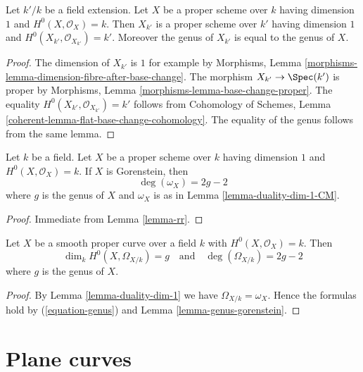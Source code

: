 \begin{lemma}
\label{lemma-genus-base-change}
Let $k'/k$ be a field extension. Let $X$ be a proper scheme over $k$ having
dimension $1$ and $H^0(X, \mathcal{O}_X) = k$. Then $X_{k'}$ is a
proper scheme over $k'$
having dimension $1$ and $H^0(X_{k'}, \mathcal{O}_{X_{k'}}) = k'$.
Moreover the genus of $X_{k'}$ is equal to the genus of $X$.
\end{lemma}

\begin{proof}
The dimension of $X_{k'}$ is $1$ for example by
Morphisms, Lemma \ref{morphisms-lemma-dimension-fibre-after-base-change}.
The morphism $X_{k'} \to \Spec(k')$ is proper by
Morphisms, Lemma \ref{morphisms-lemma-base-change-proper}.
The equality $H^0(X_{k'}, \mathcal{O}_{X_{k'}}) = k'$ follows from
Cohomology of Schemes, Lemma
\ref{coherent-lemma-flat-base-change-cohomology}.
The equality of the genus follows from the same lemma.
\end{proof}

\begin{lemma}
\label{lemma-genus-gorenstein}
Let $k$ be a field. Let $X$ be a proper scheme over $k$ having
dimension $1$ and $H^0(X, \mathcal{O}_X) = k$. If $X$ is Gorenstein,
then
$$
\deg(\omega_X) = 2g - 2
$$
where $g$ is the genus of $X$ and $\omega_X$ is as in
Lemma \ref{lemma-duality-dim-1-CM}.
\end{lemma}

\begin{proof}
Immediate from Lemma \ref{lemma-rr}.
\end{proof}

\begin{lemma}
\label{lemma-genus-smooth}
Let $X$ be a smooth proper curve over a field $k$
with $H^0(X, \mathcal{O}_X) = k$. Then
$$
\dim_k H^0(X, \Omega_{X/k}) = g
\quad\text{and}\quad
\deg(\Omega_{X/k}) = 2g - 2
$$
where $g$ is the genus of $X$.
\end{lemma}

\begin{proof}
By Lemma \ref{lemma-duality-dim-1} we have $\Omega_{X/k} = \omega_X$.
Hence the formulas hold by (\ref{equation-genus}) and
Lemma \ref{lemma-genus-gorenstein}.
\end{proof}






\section{Plane curves}
\label{section-plane-curves}

